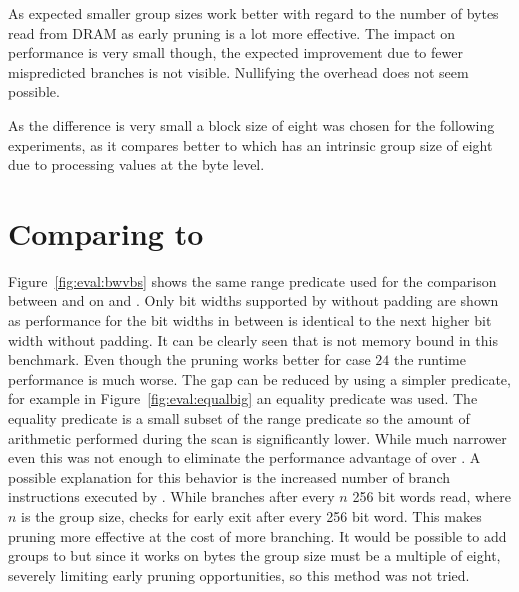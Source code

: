 As expected smaller group sizes work better with regard to the number of bytes
read from DRAM as early pruning is a lot more effective. The impact on
performance is very small though, the expected improvement due to fewer
mispredicted branches is not visible. Nullifying the overhead does not seem
possible.

As the difference is very small a block size of eight was chosen for the
following experiments, as it compares better to \bs{} which has an intrinsic
group size of eight due to processing values at the byte level.

\section{Comparing \bwv{} to \bs{}}

Figure~\ref{fig:eval:bwvbs} shows the same range predicate used for the
comparison between \simdscan{} and \bwv{} on \bs{} and \bwv{}. Only bit widths
supported by \bs{} without padding are shown as \bs{} performance for the bit
widths in between is identical to the next higher bit width without padding. It
can be clearly seen that \bs{} is not memory bound in this benchmark. Even
though the pruning works better for case $24$ the runtime performance is much
worse. The gap can be reduced by using a simpler predicate, for example in
Figure~\ref{fig:eval:equalbig} an equality predicate was used.  The equality
predicate is a small subset of the range predicate so the amount of arithmetic
performed during the scan is significantly lower.  While much narrower even this
was not enough to eliminate the performance advantage of \bwv{} over \bs{}. A
possible explanation for this behavior is the increased number of branch
instructions executed by \bs{}. While \bwv{} branches after every $n$ 256 bit
words read, where $n$ is the group size, \bs{} checks for early exit after every
256 bit word. This makes pruning more effective at the cost of more branching.
It would be possible to add groups to \bs{} but since it works on bytes the
group size must be a multiple of eight, severely limiting early pruning
opportunities, so this method was not tried.


